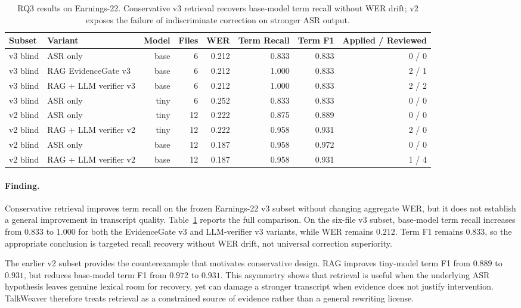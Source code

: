 \documentclass[10pt,twocolumn]{article}
\begin{document}
\begin{table}[t]
\centering
\footnotesize
\setlength{\tabcolsep}{3.5pt}
\renewcommand{\arraystretch}{1.12}
\begin{adjustbox}{max width=\textwidth}
\begin{tabular}{llrrrrrr}
\toprule
Subset & Variant & Model & Files & WER & Term Recall & Term F1 & Applied / Reviewed \\
\midrule
v3 blind & ASR only & base & 6 & 0.212 & 0.833 & 0.833 & 0 / 0 \\
v3 blind & RAG EvidenceGate v3 & base & 6 & 0.212 & 1.000 & 0.833 & 2 / 1 \\
v3 blind & RAG + LLM verifier v3 & base & 6 & 0.212 & 1.000 & 0.833 & 2 / 2 \\
v3 blind & ASR only & tiny & 6 & 0.252 & 0.833 & 0.833 & 0 / 0 \\
\midrule
v2 blind & ASR only & tiny & 12 & 0.222 & 0.875 & 0.889 & 0 / 0 \\
v2 blind & RAG + LLM verifier v2 & tiny & 12 & 0.222 & 0.958 & 0.931 & 2 / 0 \\
v2 blind & ASR only & base & 12 & 0.187 & 0.958 & 0.972 & 0 / 0 \\
v2 blind & RAG + LLM verifier v2 & base & 12 & 0.187 & 0.958 & 0.931 & 1 / 4 \\
\bottomrule
\end{tabular}
\end{adjustbox}
\caption{RQ3 results on Earnings-22. Conservative v3 retrieval recovers base-model term recall without WER drift; v2 exposes the failure of indiscriminate correction on stronger ASR output.}
\label{tab:rq3}
\end{table}

\paragraph{Finding.}
Conservative retrieval improves term recall on the frozen Earnings-22 v3 subset without changing aggregate WER, but it does not establish a general improvement in transcript quality. Table~\ref{tab:rq3} reports the full comparison. On the six-file v3 subset, base-model term recall increases from \(0.833\) to \(1.000\) for both the EvidenceGate v3 and LLM-verifier v3 variants, while WER remains \(0.212\). Term F1 remains \(0.833\), so the appropriate conclusion is targeted recall recovery without WER drift, not universal correction superiority.

The earlier v2 subset provides the counterexample that motivates conservative design. RAG improves tiny-model term F1 from \(0.889\) to \(0.931\), but reduces base-model term F1 from \(0.972\) to \(0.931\). This asymmetry shows that retrieval is useful when the underlying ASR hypothesis leaves genuine lexical room for recovery, yet can damage a stronger transcript when evidence does not justify intervention. TalkWeaver therefore treats retrieval as a constrained source of evidence rather than a general rewriting license.
\end{document}
